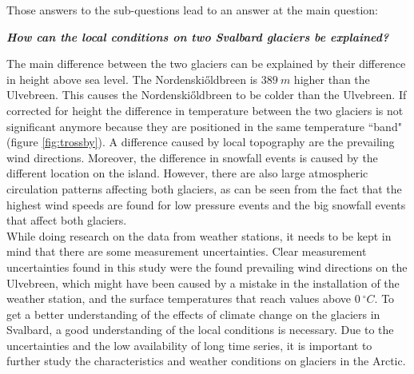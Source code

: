 \documentclass[11pt]{report}
\begin{document}
\newpage
Those answers to the sub-questions lead to an answer at the main question:

\textbf{\textit{How can the local conditions on two Svalbard glaciers be explained?}}

The main difference between the two glaciers can be explained by their difference in height above sea level. The Nordenski\H{o}ldbreen is $\SI{389}{m}$ higher than the Ulvebreen. This causes the Nordenski\H{o}ldbreen to be colder than the Ulvebreen. If corrected for height the difference in temperature between the two glaciers is not significant anymore because they are positioned in the same temperature ``band" (figure \ref{fig:trossby}). 
A difference caused by local topography are the prevailing wind directions. Moreover, the difference in snowfall events is caused by the different location on the island. However, there are also large atmospheric circulation patterns affecting both glaciers, as can be seen from the fact that the highest wind speeds are found for low pressure events and the big snowfall events that affect both glaciers.  \\

While doing research on the data from weather stations, it needs to be kept in mind that there are some measurement uncertainties. Clear measurement uncertainties found in this study were the found prevailing wind directions on the Ulvebreen, which might have been caused by a mistake in the installation of the weather station, and the surface temperatures that reach values above $\SI{0}{^\circ C}$. 
To get a better understanding of the effects of climate change on the glaciers in Svalbard, a good understanding of the local conditions is necessary. Due to the uncertainties and the low availability of long time series, it is important to further study the characteristics and weather conditions on glaciers in the Arctic.
\end{document}
